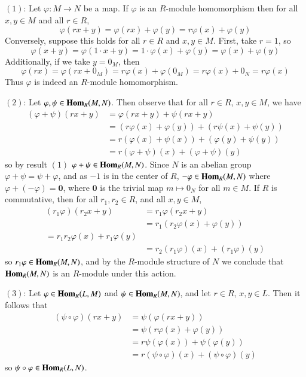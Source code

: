 \documentclass[12pt, a4paper, twoside, openright, titlepage]{book}
\begin{document}
\begin{proof*}{}{}
    $(1)$: Let $\varphi:M\rightarrow N$ be a map. If $\varphi$ is an $R$-module homomorphism then for all $x,y \in M$ and all $r \in R$, $$\varphi(rx+y) = \varphi(rx)+\varphi(y) = r\varphi(x)+\varphi(y)$$ Conversely, suppose this holds for all $r \in R$ and $x,y \in M$. First, take $r = 1$, so $$\varphi(x+y) = \varphi(1\cdot x + y) = 1\cdot \varphi(x)+\varphi(y) = \varphi(x)+\varphi(y)$$ Additionally, if we take $y = 0_M$, then \begin{equation*}
        \varphi(rx) = \varphi(rx+0_M) = r\varphi(x)+\varphi(0_M) = r\varphi(x)+0_N = r\varphi(x)
    \end{equation*}
    Thus $\varphi$ is indeed an $R$-module homomorphism.

    $(2)$: Let $\varphi,\psi \in \mathbf{Hom}_R(M,N)$. Then observe that for all $r \in R$, $x,y \in M$, we have \begin{align*}
        (\varphi+\psi)(rx+y) &= \varphi(rx+y)+\psi(rx+y) \\
        &= (r\varphi(x)+\varphi(y))+(r\psi(x)+\psi(y)) \\
        &= r(\varphi(x)+\psi(x))+(\varphi(y)+\psi(y)) \\
        &= r(\varphi+\psi)(x)+(\varphi+\psi)(y)
    \end{align*}
    so by result $(1)$ $\varphi + \psi \in \mathbf{Hom}_R(M,N)$. Since $N$ is an abelian group $\varphi+\psi = \psi + \varphi$, and as $-1$ is in the center of $R$, $-\varphi \in \mathbf{Hom}_R(M,N)$ where $\varphi+(-\varphi) = \mathbf{0}$, where $\mathbf{0}$ is the trivial map $m \mapsto 0_N$ for all $m \in M$. If $R$ is commutative, then for all $r_1, r_2 \in R$, and all $x,y \in M$, \begin{align*}
        (r_1\varphi)(r_2x+y) &= r_1\varphi(r_2x+y) \\
        &= r_1(r_2\varphi(x)+\varphi(y)) \\
        = r_1r_2\varphi(x)+r_1\varphi(y) \\
        &= r_2(r_1\varphi)(x)+(r_1\varphi)(y)
    \end{align*}
    so $r_1\varphi \in \mathbf{Hom}_R(M,N)$, and by the $R$-module structure of $N$ we conclude that $\mathbf{Hom}_R(M,N)$ is an $R$-module under this action.

    $(3)$: Let $\varphi \in \mathbf{Hom}_R(L,M)$ and $\psi \in \mathbf{Hom}_R(M,N)$, and let $r \in R$, $x,y \in L$. Then it follows that \begin{align*}
        (\psi\circ \varphi)(rx+y) &= \psi(\varphi(rx+y)) \\
        &= \psi(r\varphi(x)+\varphi(y)) \\
        &= r\psi(\varphi(x)) + \psi(\varphi(y)) \\
        &= r(\psi\circ \varphi)(x)+(\psi\circ \varphi)(y)
    \end{align*}
    so $\psi \circ \varphi \in \mathbf{Hom}_R(L,N)$.



\end{proof*}
\end{document}
